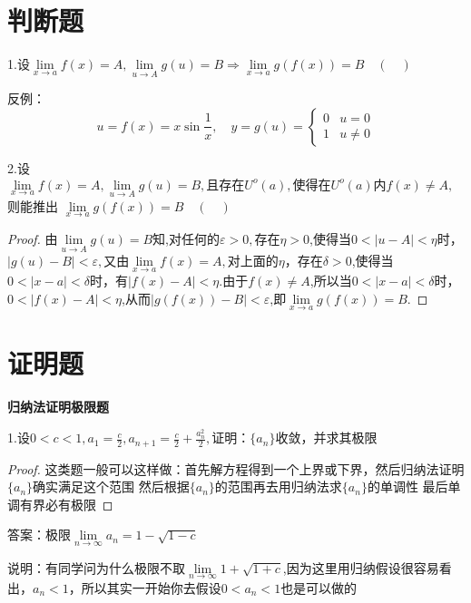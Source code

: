 \documentclass[12pt, a4paper]{ctexart}
\begin{document}
\section{判断题}
    \begin{flushleft}

    1.设$\lim \limits _{x \rightarrow a} f(x) = A,\lim \limits _{u \rightarrow A} g(u) = B \Rightarrow \lim \limits _{x \rightarrow a} g(f(x)) = B \quad(\quad)$

    反例：\[
    u=f(x)=x \sin \frac{1}{x}, \quad y=g(u)=    
    \left\{
    \begin{array}{ll}
    {0} & {u=0} \\ 
    {1} & {u \neq 0}
    \end{array}\right.
    \]

    2.设$\lim \limits _{x \rightarrow a} f(x) = A, \lim \limits _{u \rightarrow A} g(u) = B,\text{且存在} U^{o}(a),\text{使得在}U^{o}(a)\text{内} f(x) \neq A,$则能推出 $\lim \limits _{x \rightarrow a} g(f(x)) = B \quad(\quad)$

    \begin{proof}
    由$\lim \limits _{u \rightarrow A} g(u) = B$知,对任何的$\varepsilon > 0,$存在$\eta > 0$,使得当$0 < \vert u - A \vert < \eta$时，$\vert g(u) - B \vert < \varepsilon,$又由$\lim \limits _{x \rightarrow a} f(x) = A,$对上面的$\eta$，存在$\delta > 0$,使得当$0 < \vert x - a \vert < \delta$时，有$\vert f(x) - A \vert< \eta$.由于$f(x) \neq A$,所以当$0 < \vert x - a \vert < \delta$时，$0 < \vert f(x) - A \vert < \eta $,从而$\vert g(f(x)) - B \vert < \varepsilon$,即$\lim \limits _{x \rightarrow a}g(f(x)) = B.$
    \end{proof}

    \end{flushleft}

\section{证明题}
    \begin{flushleft}
    
    {\bfseries 归纳法证明极限题}

    1.设$0<c<1,a_1 = \frac{c}{2},a_{n+1}=\frac{c}{2}+\frac{a_n^2}{2},$证明：$\{a_n\}$收敛，并求其极限
    \begin{proof} %
    这类题一般可以这样做：首先解方程得到一个上界或下界，然后归纳法证明$\{a_n\}$确实满足这个范围
    然后根据$\{a_n\}$的范围再去用归纳法求$\{a_n\}$的单调性
    最后单调有界必有极限
    \end{proof}
    \par
    \par
    答案：极限$\lim \limits _{n \rightarrow \infty} a_n = 1 - \sqrt{1-c}$
    \par
    说明：有同学问为什么极限不取$\lim \limits _{n \rightarrow \infty}1+\sqrt{1+c}$,因为这里用归纳假设很容易看出，$a_n < 1$，所以其实一开始你去假设$0 < a_n < 1$也是可以做的

    \end{flushleft}
\end{document}
